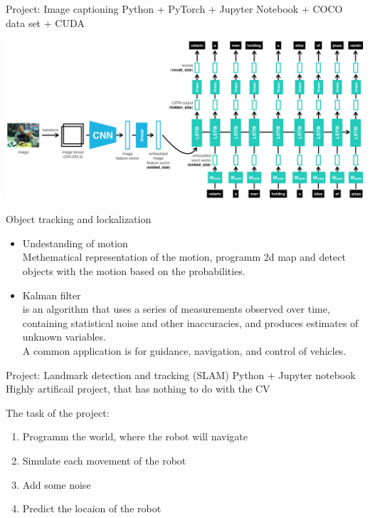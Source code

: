 \documentclass{beamer}
\begin{document}
\begin{frame}{Project: Image captioning}
Python + PyTorch + Jupyter Notebook + COCO data set + CUDA
\begin{center}
\includegraphics[scale=0.28]{images/encoder-decoder.png}
\end{center}
\end{frame}


\begin{frame}{Object tracking and lockalization}
\begin{itemize}
\item Undestanding of motion\\
Methematical representation of the motion, programm 2d map and detect objects with the motion based on the probabilities.
\item Kalman filter\\
is an algorithm that uses a series of measurements observed over time, containing statistical noise and other inaccuracies, and produces estimates of unknown variables.\\
A common application is for guidance, navigation, and control of vehicles.
\end{itemize}
\end{frame}

\begin{frame}{Project: Landmark detection and tracking (SLAM)}
Python + Jupyter notebook
\newline
\newline
Highly artificail project, that has nothing to do with the CV
\newline
\newline

The task of the project:
\begin{enumerate}
\item Programm the world, where the robot will navigate
\item Simulate each movement of the robot
\item Add some noise
\item Predict the locaion of the robot
\end{enumerate}
\end{frame}
\end{document}
